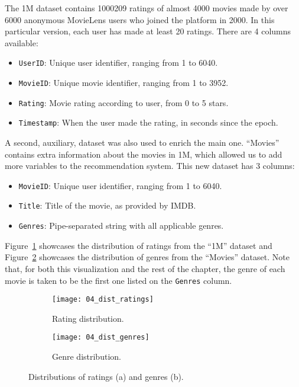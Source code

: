 The 1M dataset contains 1000209 ratings of almost 4000 movies made by over 6000
anonymous MovieLens users who joined the platform in 2000. In this particular
version, each user has made at least 20 ratings. There are 4 columns available:

\begin{itemize}
  \item \verb|UserID|: Unique user identifier, ranging from 1 to 6040.
  \item \verb|MovieID|: Unique movie identifier, ranging from 1 to 3952.
  \item \verb|Rating|: Movie rating according to user, from 0 to 5 stars.
  \item \verb|Timestamp|: When the user made the rating, in seconds since the
  epoch.
\end{itemize}

A second, auxiliary, dataset was also used to enrich the main one. ``Movies''
contains extra information about the movies in 1M, which allowed us to add more
variables to the recommendation system. This new dataset has 3 columns:

\begin{itemize}
  \item \verb|MovieID|: Unique user identifier, ranging from 1 to 6040.
  \item \verb|Title|: Title of the movie, as provided by IMDB.
  \item \verb|Genres|: Pipe-separated string with all applicable genres.
\end{itemize}

Figure~\ref{fig:fig04_dist_ratings} showcases the distribution of ratings from
the ``1M'' dataset and Figure~\ref{fig:fig04_dist_genres} showcases the
distribution of genres from the ``Movies'' dataset. Note that, for both this
visualization and the rest of the chapter, the genre of each movie is taken to
be the first one listed on the \verb|Genres| column.

\begin{figure}
  \centering
  \begin{subfigure}{0.45\textwidth}
    \centering
    \texttt{[image: 04\_dist\_ratings]}
    \caption{Rating distribution.\label{fig:fig04_dist_ratings}}
  \end{subfigure}
  \begin{subfigure}{0.45\textwidth}
    \centering
    \texttt{[image: 04\_dist\_genres]}
    \caption{Genre distribution.\label{fig:fig04_dist_genres}}
  \end{subfigure}
  \caption{Distributions of ratings (a) and genres
  (b).\label{fig:fig04_dist_both}}
\end{figure}

